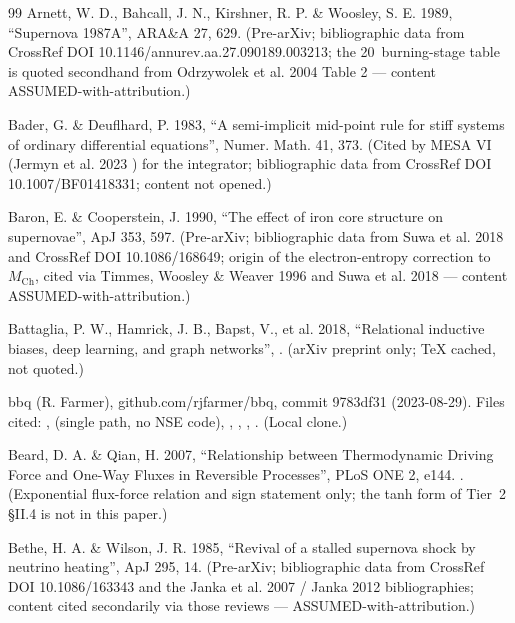 \begin{thebibliography}{99}
Arnett, W. D., Bahcall, J. N., Kirshner, R. P. \& Woosley, S. E. 1989, ``Supernova 1987A'', ARA\&A 27, 629. (Pre-arXiv; bibliographic data from CrossRef DOI 10.1146/annurev.aa.27.090189.003213; the 20\,\Msun{} burning-stage table is quoted secondhand from Odrzywolek et al. 2004 Table 2 --- content ASSUMED-with-attribution.)

Bader, G. \& Deuflhard, P. 1983, ``A semi-implicit mid-point rule for stiff systems of ordinary differential equations'', Numer. Math. 41, 373. (Cited by MESA VI (Jermyn et al. 2023 ) for the  integrator; bibliographic data from CrossRef DOI 10.1007/BF01418331; content not opened.)

Baron, E. \& Cooperstein, J. 1990, ``The effect of iron core structure on supernovae'', ApJ 353, 597. (Pre-arXiv; bibliographic data from Suwa et al. 2018  and CrossRef DOI 10.1086/168649; origin of the electron-entropy correction to $M_{\mathrm{Ch}}$, cited via Timmes, Woosley \& Weaver 1996 and Suwa et al. 2018 --- content ASSUMED-with-attribution.)

Battaglia, P. W., Hamrick, J. B., Bapst, V., et al. 2018, ``Relational inductive biases, deep learning, and graph networks'', . (arXiv preprint only; TeX cached, not quoted.)

bbq (R. Farmer), github.com/rjfarmer/bbq, commit 9783df31 (2023-08-29). Files cited: ,  (single  path, no NSE code), , , , . (Local clone.)

Beard, D. A. \& Qian, H. 2007, ``Relationship between Thermodynamic Driving Force and One-Way Fluxes in Reversible Processes'', PLoS ONE 2, e144. . (Exponential flux-force relation and sign statement only; the tanh form of Tier~2 \S II.4 is not in this paper.)

Bethe, H. A. \& Wilson, J. R. 1985, ``Revival of a stalled supernova shock by neutrino heating'', ApJ 295, 14. (Pre-arXiv; bibliographic data from CrossRef DOI 10.1086/163343 and the Janka et al. 2007 / Janka 2012 bibliographies; content cited secondarily via those reviews --- ASSUMED-with-attribution.)


\end{thebibliography}

